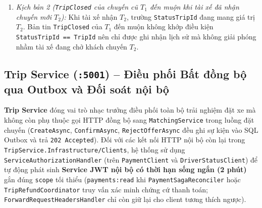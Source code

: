 \documentclass[12pt,a4paper]{article}
\begin{document}
\begin{itemize}[nosep]
\begin{enumerate}[nosep]
        \item \textit{Kịch bản 2 (\texttt{TripClosed} của chuyến cũ $T_1$ đến muộn khi tài xế đã nhận chuyến mới $T_2$):} Khi tài xế nhận $T_2$, trường \texttt{StatusTripId} đang mang giá trị $T_2$. Bản tin \texttt{TripClosed} của $T_1$ đến muộn không khớp điều kiện \texttt{StatusTripId == TripId} nên chỉ được ghi nhận lịch sử mà không giải phóng nhầm tài xế đang chở khách chuyến $T_2$.
    \end{enumerate}
\end{itemize}

\subsection{Trip Service (\texttt{:5001}) -- Điều phối Bất đồng bộ qua Outbox và Đối soát nội bộ}
\textbf{Trip Service} đóng vai trò nhạc trưởng điều phối toàn bộ trải nghiệm đặt xe mà không còn phụ thuộc gọi HTTP đồng bộ sang \texttt{MatchingService} trong luồng đặt chuyến (\texttt{CreateAsync}, \texttt{ConfirmAsync}, \texttt{RejectOfferAsync} đều ghi sự kiện vào SQL Outbox và trả \texttt{202 Accepted}). Đối với các kết nối HTTP nội bộ còn lại trong \texttt{TripService.Infrastructure/Clients}, hệ thống sử dụng \texttt{ServiceAuthorizationHandler} (trên \texttt{PaymentClient} và \texttt{DriverStatusClient}) để tự động phát sinh \textbf{Service JWT nội bộ có thời hạn sống ngắn (2 phút)} gắn đúng \texttt{scope} tối thiểu (\texttt{payments:read} khi \texttt{PaymentSagaReconciler} hoặc \texttt{TripRefundCoordinator} truy vấn xác minh chứng cứ thanh toán; \texttt{ForwardRequestHeadersHandler} chỉ còn giữ lại cho client tương thích ngược).
\end{document}
